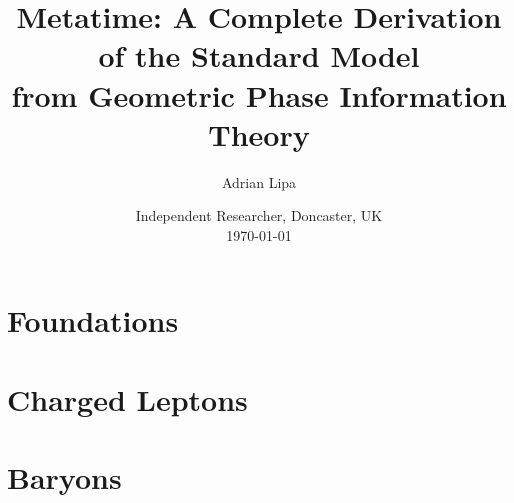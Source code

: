 \documentclass[11pt,a4paper,twoside]{book}
\theoremstyle{definition}
\begin{document}
\frontmatter

\title{Metatime: A Complete Derivation of the Standard Model \\
       from Geometric Phase Information Theory}
\author{Adrian Lipa}
\date{Independent Researcher, Doncaster, UK\\\today}

\maketitle

\tableofcontents

\mainmatter

\part{Foundations}






\part{Charged Leptons}





\part{Baryons}








\end{document}
